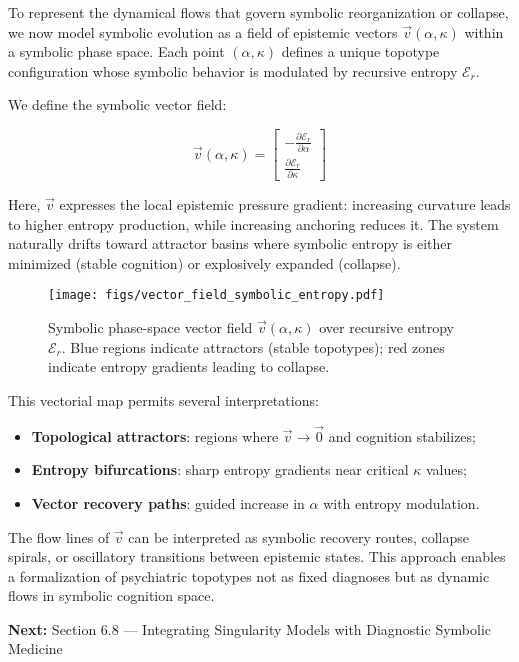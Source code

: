 To represent the dynamical flows that govern symbolic reorganization or collapse, we now model symbolic evolution as a field of epistemic vectors $\vec{v}(\alpha, \kappa)$ within a symbolic phase space. Each point $(\alpha, \kappa)$ defines a unique topotype configuration whose symbolic behavior is modulated by recursive entropy $\mathcal{E}_r$.

We define the symbolic vector field:

\[
\vec{v}(\alpha, \kappa) =
\begin{bmatrix}
-\frac{\partial \mathcal{E}_r}{\partial \alpha} \\
\frac{\partial \mathcal{E}_r}{\partial \kappa}
\end{bmatrix}
\]

Here, $\vec{v}$ expresses the local epistemic pressure gradient: increasing curvature leads to higher entropy production, while increasing anchoring reduces it. The system naturally drifts toward attractor basins where symbolic entropy is either minimized (stable cognition) or explosively expanded (collapse).

\begin{figure}[H]
\centering
\texttt{[image: figs/vector\_field\_symbolic\_entropy.pdf]}
\caption{Symbolic phase-space vector field $\vec{v}(\alpha, \kappa)$ over recursive entropy $\mathcal{E}_r$. Blue regions indicate attractors (stable topotypes); red zones indicate entropy gradients leading to collapse.}
\end{figure}

This vectorial map permits several interpretations:

\begin{itemize}
    \item \textbf{Topological attractors}: regions where $\vec{v} \to \vec{0}$ and cognition stabilizes;
    \item \textbf{Entropy bifurcations}: sharp entropy gradients near critical $\kappa$ values;
    \item \textbf{Vector recovery paths}: guided increase in $\alpha$ with entropy modulation.
\end{itemize}

The flow lines of $\vec{v}$ can be interpreted as symbolic recovery routes, collapse spirals, or oscillatory transitions between epistemic states. This approach enables a formalization of psychiatric topotypes not as fixed diagnoses but as dynamic flows in symbolic cognition space.

\bigskip
\noindent
\textbf{Next:} Section 6.8 — Integrating Singularity Models with Diagnostic Symbolic Medicine



